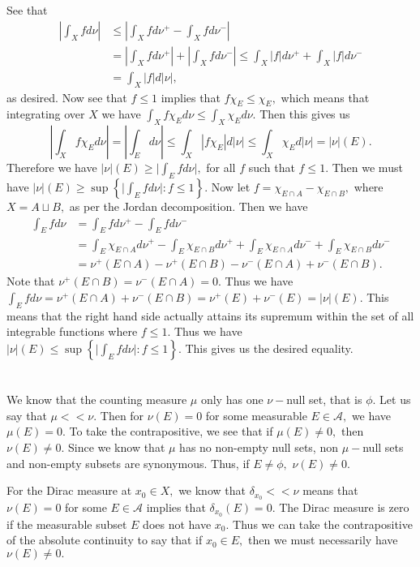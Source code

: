 \documentclass{article}
\begin{document}
\section{} %
See that \begin{align*}
	\left| \int_X f d\nu \right| &\leq \left|\int_{X}f d\nu^+ - \int_{X}f d\nu^-  \right|\\
	&= \left|\int_{X}f d\nu^+\right| + \left|\int_{X}f d\nu^-\right| \leq \int_{X}|f| d\nu^+ + \int_{X}|f| d\nu^-\\
	&= \int_{X}|f| d|\nu|,
\end{align*}
as desired.
Now see that $f \leq 1$ implies that $f\chi_E \leq \chi_E,$ which means that integrating over $X$ we have $\int_{X}f\chi_E d\nu \leq \int_{X}\chi_E d\nu.$ 
Then this gives us $$\left| \int_{X}f\chi_E d\nu \right|=\left| \int_{E} d\nu \right| \leq \int_X |f\chi_E| d|\nu|\leq \int_{X} \chi_E d|\nu|=|\nu|(E).$$ 
Therefore 
we have $ |\nu|(E) \geq \mid \int_{E}f d\nu \mid,$ for all $f$ such that $f\leq 1.$ Then we must have $|\nu|(E) \geq \sup \left\{\mid \int_{E}f d\nu \mid: f 
\leq 1\right\}.$ Now let $f=\chi_{E \cap A}-\chi_{E \cap B},$ where $X=A \sqcup B,$ as per the Jordan decomposition. Then we have 
\begin{align*}
	\int_{E}f d\nu&=\int_{E}f 
	d\nu^+-\int_{E}f d\nu^-\\
	&= \int_{E}\chi_{E \cap A} d\nu^+ - \int_{E}\chi_{E \cap B} d\nu^+ + \int_{E}\chi_{E \cap A} d\nu^- + \int_{E}\chi_{E \cap B} 
	d\nu^-\\
	&=\nu^+(E \cap A) - \nu^+(E \cap B)- \nu^-(E\cap A)+ \nu^-(E \cap B).
\end{align*} Note that $\nu^+(E \cap B)=\nu^-(E\cap A)=0.$ Thus we have $\int_{E}f d\nu= 
\nu^+(E \cap A)+ \nu^-(E \cap B)=\nu^+(E)+\nu^-(E)=|\nu|(E).$ This means that the right hand side actually attains its supremum within the set of all 
integrable functions where $f \leq 1.$ Thus we have $|\nu|(E) \leq \sup \left\{\mid \int_{E}f d\nu \mid: f \leq 1\right\}.$ This gives us the desired 
equality.
\section{} %
We know that the counting measure $\mu$ only has one $\nu-$null set, that is $\phi.$ Let us say that $\mu << \nu.$ Then for $\nu(E)=0$ for some measurable 
$E \in \mathcal{A},$ we have $\mu(E)=0.$ To take the contrapositive, we see that if $\mu(E)\neq 0,$ then $\nu(E) \neq 0.$ Since we know that $\mu$ has no 
non-empty null sets, non $\mu-$null sets and non-empty subsets are synonymous. Thus, if $E \neq \phi,$ $\nu(E) \neq 0.$

For the Dirac measure at $x_0 \in X,$ we know that $\delta_{x_0} << \nu$ means that $\nu(E)=0$ for some $E \in \mathcal{A}$ implies that 
$\delta_{x_0}(E)=0.$ The Dirac measure is zero if the measurable subset $E$ does not have $x_0.$ Thus we can take the contrapositive of the absolute 
continuity to say that if $x_0 \in E,$ then we must necessarily have $\nu(E)\neq 0.$ 
\end{document}
